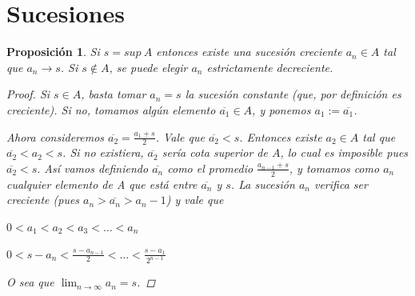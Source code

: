 \documentclass[]{article}
\newtheorem{prop}[teo]{Proposición}
\begin{document}
\section{Sucesiones}
\begin{prop}
	Si $s = sup\ A$ entonces existe una sucesión creciente ${a_n} \in A$ tal que $a_n \rightarrow s$. Si $s \not\in A$, se puede elegir $a_n$ estrictamente decreciente.
\begin{proof}
	Si $s \in A$, basta tomar $a_n = s$ la sucesión constante (que, por definición es creciente). Si no, tomamos algún elemento $\overline{a_1} \in A$, y ponemos $a_1 := \overline{a_1}$. 
	
	Ahora consideremos $\overline{a_2} = \frac{a_1 + s}{2}$. Vale que $\overline{a_2} < s$. Entonces existe $a_2 \in A$ tal que $\overline{a_2} < a_2 < s$. Si no existiera, $\overline{a_2}$ sería cota superior de $A$, lo cual es imposible pues $\overline{a_2} < s.$ Así vamos definiendo $\overline{a_n}$ como el promedio $\frac{a_{n-1}+s}{2}$, y tomamos como $a_n$ cualquier elemento de A que está entre $\overline{a_n}$ y $s$. La sucesión $a_n$ verifica ser creciente (pues $a_n > \overline{a_n} > a_n-1$) y vale que
	
	\begin{center}
		$0 < a_1 < a_2 < a_3 < \hdots < a_n$
	\end{center}
	\begin{center}
		$0 < s-a_n < \frac{s-a_{n-1}}{2} < \hdots < \frac{s-a_1}{2^{n-1}}$
	\end{center}
	O sea que $\displaystyle \lim_{n \to \infty} a_n = s$.
\end{proof}
\end{prop}
\end{document}
